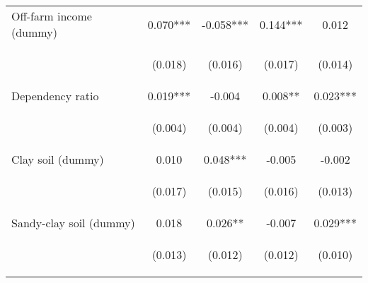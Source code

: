 \begin{center}
\begin{tabular}{lcccc}
Off-farm income (dummy) & 0.070*** & -0.058*** & 0.144*** & 0.012 \\
\vspace{4pt} & \begin{footnotesize}(0.018)\end{footnotesize} & \begin{footnotesize}(0.016)\end{footnotesize} & \begin{footnotesize}(0.017)\end{footnotesize} & \begin{footnotesize}(0.014)\end{footnotesize} \\
Dependency ratio & 0.019*** & -0.004 & 0.008** & 0.023*** \\
\vspace{4pt} & \begin{footnotesize}(0.004)\end{footnotesize} & \begin{footnotesize}(0.004)\end{footnotesize} & \begin{footnotesize}(0.004)\end{footnotesize} & \begin{footnotesize}(0.003)\end{footnotesize} \\
Clay soil (dummy) & 0.010 & 0.048*** & -0.005 & -0.002 \\
\vspace{4pt} & \begin{footnotesize}(0.017)\end{footnotesize} & \begin{footnotesize}(0.015)\end{footnotesize} & \begin{footnotesize}(0.016)\end{footnotesize} & \begin{footnotesize}(0.013)\end{footnotesize} \\
Sandy-clay soil (dummy) & 0.018 & 0.026** & -0.007 & 0.029*** \\
\vspace{4pt} & \begin{footnotesize}(0.013)\end{footnotesize} & \begin{footnotesize}(0.012)\end{footnotesize} & \begin{footnotesize}(0.012)\end{footnotesize} & \begin{footnotesize}(0.010)\end{footnotesize} \\

\end{tabular}
\end{center}
